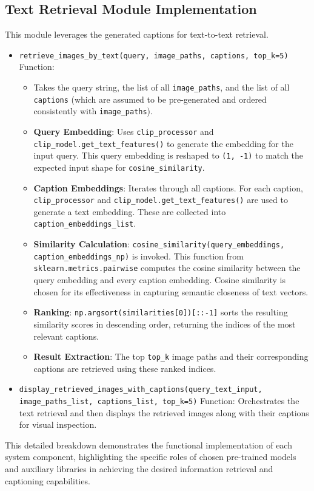 \documentclass{article}
\begin{document}
\subsection{Text Retrieval Module Implementation}
This module leverages the generated captions for text-to-text retrieval.
\begin{itemize}
    \item \texttt{retrieve\_images\_by\_text(query, image\_paths, captions, top\_k=5)} Function:
    \begin{itemize}
        \item Takes the query string, the list of all \texttt{image\_paths}, and the list of all \texttt{captions} (which are assumed to be pre-generated and ordered consistently with \texttt{image\_paths}).
        \item \textbf{Query Embedding}: Uses \texttt{clip\_processor} and \texttt{clip\_model.get\_text\_features()} to generate the embedding for the input query. This query embedding is reshaped to \texttt{(1, -1)} to match the expected input shape for \texttt{cosine\_similarity}.
        \item \textbf{Caption Embeddings}: Iterates through all captions. For each caption, \texttt{clip\_processor} and \texttt{clip\_model.get\_text\_features()} are used to generate a text embedding. These are collected into \texttt{caption\_embeddings\_list}.
        \item \textbf{Similarity Calculation}: \texttt{cosine\_similarity(query\_embeddings, caption\_embeddings\_np)} is invoked. This function from \texttt{sklearn.metrics.pairwise} computes the cosine similarity between the query embedding and every caption embedding. Cosine similarity is chosen for its effectiveness in capturing semantic closeness of text vectors.
        \item \textbf{Ranking}: \texttt{np.argsort(similarities[0])[::-1]} sorts the resulting similarity scores in descending order, returning the indices of the most relevant captions.
        \item \textbf{Result Extraction}: The top \texttt{top\_k} image paths and their corresponding captions are retrieved using these ranked indices.
    \end{itemize}
    \item \texttt{display\_retrieved\_images\_with\_captions(query\_text\_input, image\_paths\_list, captions\_list, top\_k=5)} Function: Orchestrates the text retrieval and then displays the retrieved images along with their captions for visual inspection.
\end{itemize}
This detailed breakdown demonstrates the functional implementation of each system component, highlighting the specific roles of chosen pre-trained models and auxiliary libraries in achieving the desired information retrieval and captioning capabilities.
\end{document}
